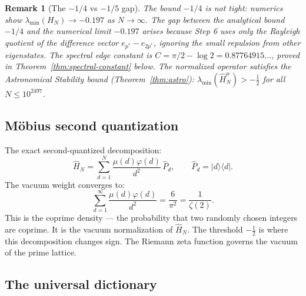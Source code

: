 \documentclass[12pt]{article}
\newtheorem{remark}[theorem]{Remark}
\newcommand{\ket}[1]{|{#1}\rangle}
\newcommand{\bra}[1]{\langle{#1}|}
\newcommand{\half}{\tfrac{1}{2}}
\begin{document}
\begin{remark}[The $-1/4$ vs $-1/5$ gap]
The bound $-1/4$ is not tight: numerics show $\lambda_{\min}(H_N)\to -0.197$
as $N\to\infty$. The gap between the analytical bound $-1/4$
and the numerical limit $-0.197$ arises because Step 6 uses only the
Rayleigh quotient of the difference vector $e_{p^*} - e_{2p^*}$,
ignoring the small repulsion from other eigenstates.
The spectral edge constant is $C = \pi/2 - \log 2 = 0.87764915\ldots$,
proved in Theorem~\ref{thm:spectral-constant} below.
The \emph{normalized} operator satisfies the Astronomical Stability bound
(Theorem~\ref{thm:astro}): $\lambda_{\min}(\hat{H}_N^\mu) > -\half$ for all $N \le 10^{2497}$.
\end{remark}

\subsection{M\"{o}bius second quantization}

\begin{tcolorbox}[qbox]
The exact second-quantized decomposition:
\[
  \hat{H}_N = \sum_{d=1}^{N} \frac{\mu(d)\varphi(d)}{d^2}\,\hat{P}_d,
  \qquad \hat{P}_d = \ket{d}\bra{d}.
\]
The vacuum weight converges to:
\[
  \sum_{d=1}^\infty \frac{\mu(d)\varphi(d)}{d^2}
  = \frac{6}{\pi^2} = \frac{1}{\zeta(2)}.
\]
This is the coprime density --- the probability that two randomly chosen
integers are coprime.
It is the vacuum normalization of $\hat{H}_N$.
The threshold $-\half$ is where this decomposition changes sign.
The Riemann zeta function governs the vacuum of the prime lattice.
\end{tcolorbox}

\subsection{The universal dictionary}
\end{document}
